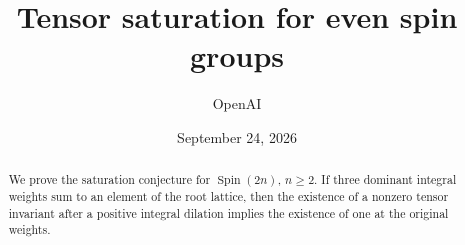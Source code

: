 \documentclass[11pt]{article}
\title{Tensor saturation for even spin groups}
\author{OpenAI}
\date{September 24, 2026}
\DeclareMathOperator{\Spin}{Spin}
\theoremstyle{definition}
\theoremstyle{remark}
\numberwithin{equation}{section}
\begin{document}
\maketitle
\begin{abstract}
We prove the saturation conjecture for $\Spin(2n)$, $n\ge2$.
If three dominant integral weights sum to an element of the root lattice,
then the existence of a nonzero tensor invariant after a positive integral
dilation implies the existence of one at the original weights.
\end{abstract}








\end{document}
